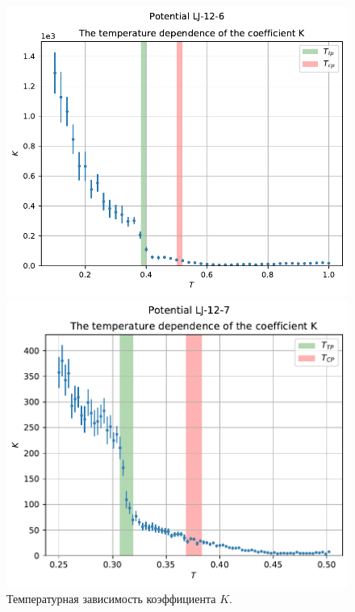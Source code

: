 \documentclass[pdf,hyperref={unicode}]{beamer}
\begin{document}
\begin{frame}
\begin{columns}
\begin{column}{0.6\linewidth}
{\begin{figure}[h]
\begin{center}
\begin{minipage}[h]{0.45\linewidth}
\includegraphics[width=\textwidth, keepaspectratio]{plot_K_Potential LJ-12-6_1}
\end{minipage}
\begin{minipage}[h]{0.45\linewidth}
\includegraphics[width=\textwidth, keepaspectratio]{plot_K_Potential LJ-12-7_1}
\end{minipage}
\caption{\tiny Температурная зависимость коэффициента $K$.}
\label{risK}
\end{center}
\end{figure}
}
\end{column}


\end{columns}
\end{frame}
\end{document}
